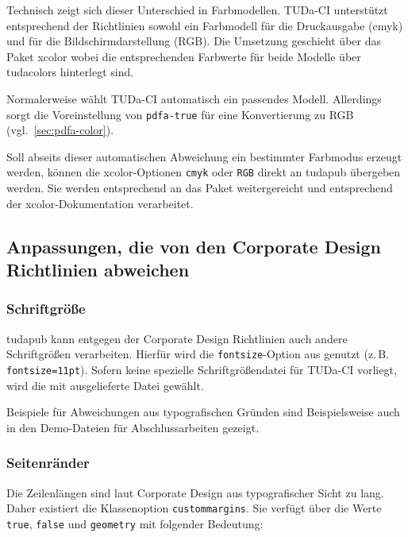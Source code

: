 \documentclass[
	german,%
	accentcolor=9c,%
]{tudapub}
\newcommand*{\code}[1]{\texttt{#1}}
\newcommand*{\pkg}[1]{\textsf{#1}}
\newcommand*{\cls}[1]{\textsf{#1}}
\begin{document}
Technisch zeigt sich dieser Unterschied in Farbmodellen. TUDa-CI unterstützt entsprechend der Richtlinien sowohl ein Farbmodell für die Druckausgabe (cmyk) und für die Bildschirmdarstellung (RGB). Die Umsetzung geschieht über das Paket \pkg{xcolor} wobei die entsprechenden Farbwerte für beide Modelle über \pkg{tudacolors} hinterlegt sind.

Normalerweise wählt TUDa-CI automatisch ein passendes Modell. Allerdings sorgt die Voreinstellung von \code{pdfa-true} für eine Konvertierung zu RGB (vgl.~\ref{sec:pdfa-color}).

Soll abseits dieser automatischen Abweichung ein bestimmter Farbmodus erzeugt werden, können die \pkg{xcolor}-Optionen \code{cmyk} oder \code{RGB} direkt an \cls{tudapub} übergeben werden. Sie werden entsprechend an das Paket weitergereicht und entsprechend der \pkg{xcolor}-Dokumentation verarbeitet.

\subsection{Anpassungen, die von den Corporate Design Richtlinien abweichen}

\subsubsection{Schriftgröße}
\cls{tudapub} kann entgegen der Corporate Design Richtlinien auch andere Schriftgrößen verarbeiten. Hierfür wird die \code{fontsize}-Option aus \KOMAScript{} genutzt (z.\,B. \code{fontsize=11pt}). Sofern keine spezielle Schriftgrößendatei für TUDa-CI vorliegt, wird die mit \KOMAScript{} ausgelieferte Datei gewählt.

Beispiele für Abweichungen aus typografischen Gründen sind Beispielsweise auch in den Demo-Dateien für Abschlussarbeiten gezeigt.

\subsubsection{Seitenränder}
Die Zeilenlängen sind laut Corporate Design aus typografischer Sicht zu lang.
Daher existiert die Klassenoption \code{custommargins}. Sie verfügt über die Werte \code{true}, \code{false} und \code{geometry} mit folgender Bedeutung:
\end{document}
